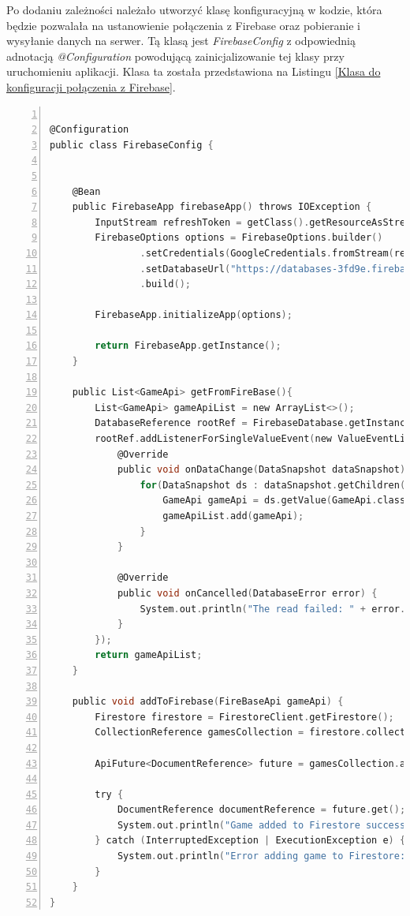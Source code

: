 Po dodaniu zależności należało utworzyć klasę konfiguracyjną w kodzie, która będzie pozwalała na ustanowienie połączenia z Firebase oraz pobieranie i wysyłanie danych na serwer.
Tą klasą jest \textit{FirebaseConfig} z odpowiednią adnotacją \textit{@Configuration} powodującą zainicjalizowanie tej klasy przy uruchomieniu aplikacji.
Klasa ta została przedstawiona na Listingu \ref{Klasa do konfiguracji połączenia z Firebase}.
\begin{lstlisting}[language=C, mathescape, frame=single, numbers=left, xleftmargin=2em, framexleftmargin=2em, basicstyle=\ttfamily\bfseries, caption={Klasa do konfiguracji połączenia z Firebase}, label={Klasa do konfiguracji połączenia z Firebase}]

@Configuration
public class FirebaseConfig {


    @Bean
    public FirebaseApp firebaseApp() throws IOException {
        InputStream refreshToken = getClass().getResourceAsStream("/key.json");
        FirebaseOptions options = FirebaseOptions.builder()
                .setCredentials(GoogleCredentials.fromStream(refreshToken))
                .setDatabaseUrl("https://databases-3fd9e.firebaseio.com/")
                .build();

        FirebaseApp.initializeApp(options);

        return FirebaseApp.getInstance();
    }

    public List<GameApi> getFromFireBase(){
        List<GameApi> gameApiList = new ArrayList<>();
        DatabaseReference rootRef = FirebaseDatabase.getInstance().getReference();
        rootRef.addListenerForSingleValueEvent(new ValueEventListener() {
            @Override
            public void onDataChange(DataSnapshot dataSnapshot) {
                for(DataSnapshot ds : dataSnapshot.getChildren()) {
                    GameApi gameApi = ds.getValue(GameApi.class);
                    gameApiList.add(gameApi);
                }
            }

            @Override
            public void onCancelled(DatabaseError error) {
                System.out.println("The read failed: " + error.getCode());
            }
        });
        return gameApiList;
    }

    public void addToFirebase(FireBaseApi gameApi) {
        Firestore firestore = FirestoreClient.getFirestore();
        CollectionReference gamesCollection = firestore.collection("games");

        ApiFuture<DocumentReference> future = gamesCollection.add(gameApi);

        try {
            DocumentReference documentReference = future.get();
            System.out.println("Game added to Firestore successfully at: " + documentReference.getPath());
        } catch (InterruptedException | ExecutionException e) {
            System.out.println("Error adding game to Firestore: " + e.getMessage());
        }
    }
}
\end{lstlisting}
